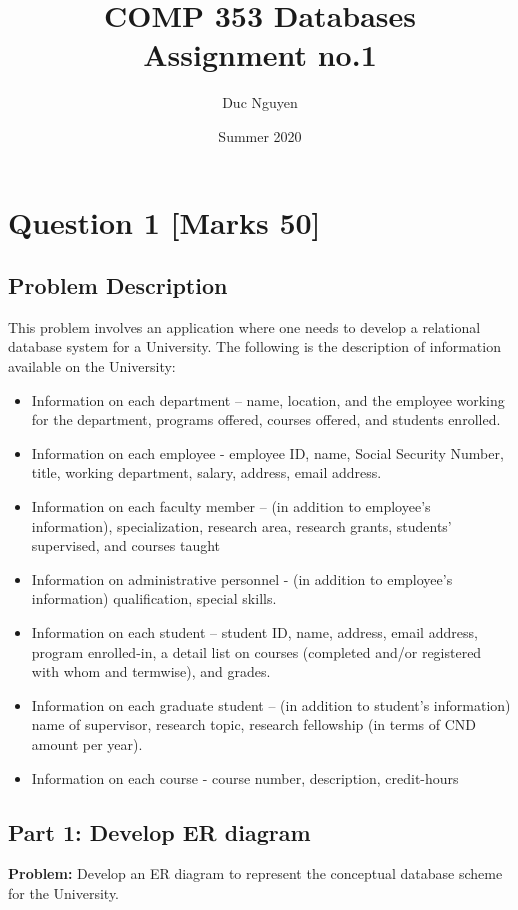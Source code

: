 \documentclass[a4paper]{article}
\title{COMP 353 Databases\\
Assignment no.1}
\author{Duc Nguyen}
\affil{Gina Cody School of Computer Science and Software Engineering \\
    Concordia University, Montreal, QC, Canada}
\date{Summer 2020}
\begin{document}
\maketitle

\newpage
\tableofcontents
\newpage

\section{Question 1 [Marks 50]}
\subsection{Problem Description}%

This problem involves an application where one needs to develop a relational database system
for a University. The following is the description of information available on the University:

\begin{itemize}
    \item Information on each department – name, location, and the employee working for the
department, programs offered, courses offered, and students enrolled.
    \item Information on each employee - employee ID, name, Social Security Number, title,
working department, salary, address, email address.
    \item Information on each faculty member – (in addition to employee’s information),
specialization, research area, research grants, students’ supervised, and courses taught
    \item Information on administrative personnel - (in addition to employee’s information)
qualification, special skills. 
    \item Information on each student – student ID, name, address, email address, program
enrolled-in, a detail list on courses (completed and/or registered with whom and termwise), and grades.
    \item Information on each graduate student – (in addition to student’s information) name of
supervisor, research topic, research fellowship (in terms of CND amount per year).
    \item Information on each course - course number, description, credit-hours
\end{itemize}
\newpage

\subsection{Part 1: Develop ER diagram}%
\label{sub:part_1_develop_er_diagram}
\textbf{Problem:}
Develop an ER diagram to represent the conceptual database scheme for the University.
\end{document}
